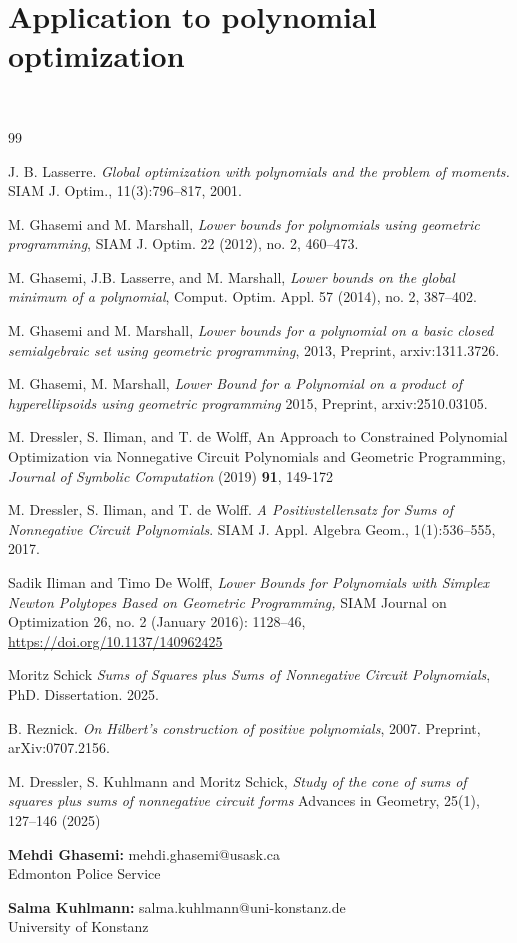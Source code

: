 \documentclass{article}
\begin{document}
\section{Application to polynomial optimization}
\label{s06}
~~
\begin{thebibliography}{99}

 J. B. Lasserre. \emph{Global optimization with polynomials and the problem of moments.} SIAM J. Optim., 11(3):796--817, 2001.

 M. Ghasemi and M. Marshall, \emph{Lower bounds for polynomials using geometric programming}, SIAM J. Optim. 22 (2012), no. 2, 460--473.

 M. Ghasemi, J.B. Lasserre, and M. Marshall, \emph{Lower bounds on the global minimum of a polynomial}, Comput. Optim. Appl. 57 (2014), no. 2, 387--402.

 M. Ghasemi and M. Marshall, \emph{Lower bounds for a polynomial on a basic closed semialgebraic set using geometric programming}, 2013, Preprint, arxiv:1311.3726.

 M. Ghasemi, M. Marshall, \emph{Lower Bound for a Polynomial on a product of hyperellipsoids using geometric programming} 2015, Preprint, arxiv:2510.03105.

 M. Dressler, S. Iliman, and T. de Wolff, An Approach to Constrained Polynomial Optimization via Nonnegative Circuit Polynomials and Geometric Programming, \emph{Journal of Symbolic Computation} (2019) \textbf{91}, 149-172

 M. Dressler, S. Iliman, and T. de Wolff. \emph{A Positivstellensatz for Sums of Nonnegative Circuit Polynomials}. SIAM J. Appl. Algebra Geom., 1(1):536--555, 2017.

 Sadik Iliman and Timo De Wolff, \emph{Lower Bounds for Polynomials with Simplex Newton Polytopes Based on Geometric Programming,} SIAM Journal on Optimization 26, no. 2 (January 2016): 1128--46, \url{https://doi.org/10.1137/140962425}

 Moritz Schick \emph{Sums of Squares plus Sums of Nonnegative Circuit Polynomials}, PhD. Dissertation. 2025.

 B. Reznick. \emph{On Hilbert's construction of positive polynomials}, 2007. Preprint, arXiv:0707.2156.

 M. Dressler, S. Kuhlmann and Moritz Schick, \emph{Study of the cone of sums of squares plus sums of nonnegative circuit forms} Advances in Geometry, 25(1), 127--146 (2025)

\end{thebibliography}

\bigskip

\noindent\textbf{Mehdi Ghasemi:} mehdi.ghasemi@usask.ca\\
Edmonton Police Service

\noindent\textbf{Salma Kuhlmann:} salma.kuhlmann@uni-konstanz.de\\
University of Konstanz
\end{document}
